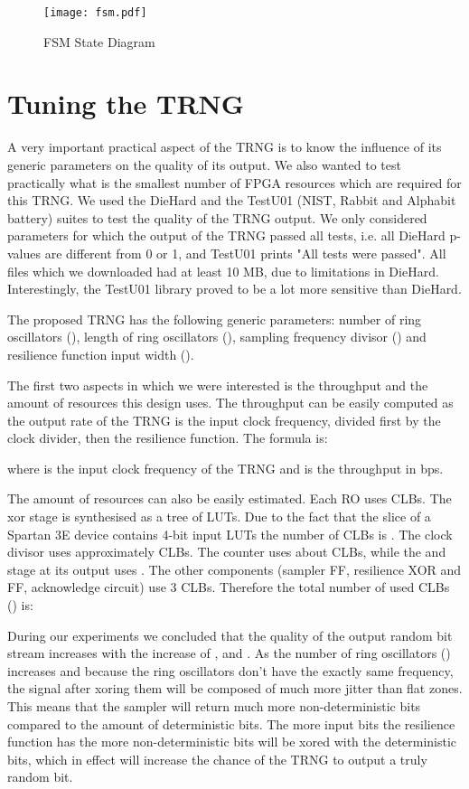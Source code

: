 \documentclass[conference]{IEEEtran}
\begin{document}
\begin{figure*}[!t]
\centering
\texttt{[image: fsm.pdf]}
\caption{FSM State Diagram}
\label{fig:fsm}
\end{figure*}

\section{Tuning the TRNG}
A very important practical aspect of the TRNG is to know the influence of its generic parameters on the quality of its output. We also wanted to test practically what is the smallest number of FPGA resources which are required for this TRNG. We used the DieHard\cite{DieHard} and the TestU01\cite{TestU01} (NIST, Rabbit and Alphabit battery) suites to test the quality of the TRNG output. We only considered parameters for which the output of the TRNG passed all tests, i.e. all DieHard p-values are different from 0 or 1, and TestU01 prints "All tests were passed". All files which we downloaded had at least 10 MB, due to limitations in DieHard. Interestingly, the TestU01 library proved to be a lot more sensitive than DieHard.

The proposed TRNG has the following generic parameters: number of ring oscillators (), length of ring oscillators (), sampling frequency divisor () and resilience function input width ().

The first two aspects in which we were interested is the throughput and the amount of resources this design uses. The throughput can be easily computed as the output rate of the TRNG is the input clock frequency, divided first by the clock divider, then the resilience function. The formula is:


where  is the input clock frequency of the TRNG and  is the throughput in bps.

The amount of resources can also be easily estimated. Each RO uses  CLBs. The xor stage is synthesised as a tree of LUTs. Due to the fact that the slice of a Spartan 3E device contains 4-bit input LUTs the number of CLBs is . The clock divisor uses approximately  CLBs. The counter uses about  CLBs, while the and stage at its output uses . The other components (sampler FF, resilience XOR and FF, acknowledge circuit) use 3 CLBs. Therefore the total number of used CLBs () is:



During our experiments we concluded that the quality of the output random bit stream increases with the increase of ,  and . As the number of ring oscillators () increases and because the ring oscillators don't have the exactly same frequency, the signal after xoring them will be composed of much more jitter than flat zones. This means that the sampler will return much more non-deterministic bits compared to the amount of deterministic bits. The more input bits the resilience function has the more non-deterministic bits will be xored with the deterministic bits, which in effect will increase the chance of the TRNG to output a truly random bit.
\end{document}
